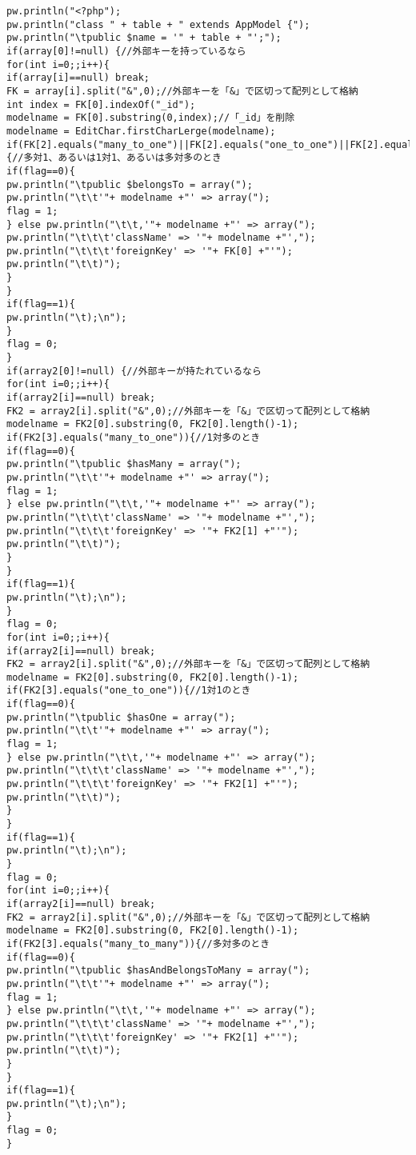 \documentclass{funthesis}
\begin{document}
\begin{lstlisting}[caption=WriteModel .java,label=1]
pw.println("<?php");
pw.println("class " + table + " extends AppModel {");
pw.println("\tpublic $name = '" + table + "';");
if(array[0]!=null) {//外部キーを持っているなら
for(int i=0;;i++){
if(array[i]==null) break;
FK = array[i].split("&",0);//外部キーを「&」で区切って配列として格納
int index = FK[0].indexOf("_id");
modelname = FK[0].substring(0,index);//「_id」を削除
modelname = EditChar.firstCharLerge(modelname);
if(FK[2].equals("many_to_one")||FK[2].equals("one_to_one")||FK[2].equals("many_to_many")){//多対1、あるいは1対1、あるいは多対多のとき
if(flag==0){
pw.println("\tpublic $belongsTo = array(");
pw.println("\t\t'"+ modelname +"' => array(");
flag = 1;
} else pw.println("\t\t,'"+ modelname +"' => array(");
pw.println("\t\t\t'className' => '"+ modelname +"',");
pw.println("\t\t\t'foreignKey' => '"+ FK[0] +"'");
pw.println("\t\t)");
}
}
if(flag==1){
pw.println("\t);\n");
}
flag = 0;
}
if(array2[0]!=null) {//外部キーが持たれているなら
for(int i=0;;i++){
if(array2[i]==null) break;
FK2 = array2[i].split("&",0);//外部キーを「&」で区切って配列として格納
modelname = FK2[0].substring(0, FK2[0].length()-1);
if(FK2[3].equals("many_to_one")){//1対多のとき
if(flag==0){
pw.println("\tpublic $hasMany = array(");
pw.println("\t\t'"+ modelname +"' => array(");
flag = 1;
} else pw.println("\t\t,'"+ modelname +"' => array(");
pw.println("\t\t\t'className' => '"+ modelname +"',");
pw.println("\t\t\t'foreignKey' => '"+ FK2[1] +"'");
pw.println("\t\t)");
}
}
if(flag==1){
pw.println("\t);\n");
}
flag = 0;
for(int i=0;;i++){
if(array2[i]==null) break;
FK2 = array2[i].split("&",0);//外部キーを「&」で区切って配列として格納
modelname = FK2[0].substring(0, FK2[0].length()-1);
if(FK2[3].equals("one_to_one")){//1対1のとき
if(flag==0){
pw.println("\tpublic $hasOne = array(");
pw.println("\t\t'"+ modelname +"' => array(");
flag = 1;
} else pw.println("\t\t,'"+ modelname +"' => array(");
pw.println("\t\t\t'className' => '"+ modelname +"',");
pw.println("\t\t\t'foreignKey' => '"+ FK2[1] +"'");
pw.println("\t\t)");
}
}
if(flag==1){
pw.println("\t);\n");
}
flag = 0;
for(int i=0;;i++){
if(array2[i]==null) break;
FK2 = array2[i].split("&",0);//外部キーを「&」で区切って配列として格納
modelname = FK2[0].substring(0, FK2[0].length()-1);
if(FK2[3].equals("many_to_many")){//多対多のとき
if(flag==0){
pw.println("\tpublic $hasAndBelongsToMany = array(");
pw.println("\t\t'"+ modelname +"' => array(");
flag = 1;
} else pw.println("\t\t,'"+ modelname +"' => array(");
pw.println("\t\t\t'className' => '"+ modelname +"',");
pw.println("\t\t\t'foreignKey' => '"+ FK2[1] +"'");
pw.println("\t\t)");
}
}
if(flag==1){
pw.println("\t);\n");
}
flag = 0;
}


\end{lstlisting}
\end{document}
